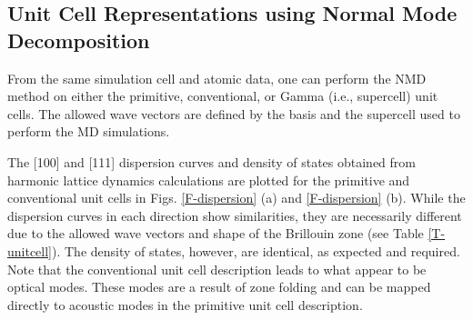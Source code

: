 \subsection{\label{A:unitcell}Unit Cell Representations using 
Normal Mode Decomposition}


From the same simulation cell and atomic data, one can perform the NMD 
method on either the primitive, conventional, or Gamma (i.e., supercell) 
unit cells. The allowed wave vectors are defined by the basis 
and the supercell used to perform the MD simulations. 

The [100] and [111] dispersion curves and density of 
states obtained from harmonic lattice dynamics calculations are plotted 
for the primitive and conventional unit cells in 
Figs. \ref{F-dispersion} (a) and \ref{F-dispersion} (b). While the 
dispersion curves in each direction show similarities, they are 
necessarily different due to the allowed wave vectors and shape of the 
Brillouin zone (see Table \ref{T-unitcell}). The density of states, 
however, are identical, as expected and required. Note that the 
conventional unit cell description leads to what appear to be optical 
modes. These modes are a result of zone folding and can be 
mapped directly to acoustic modes in the primitive unit cell description.


